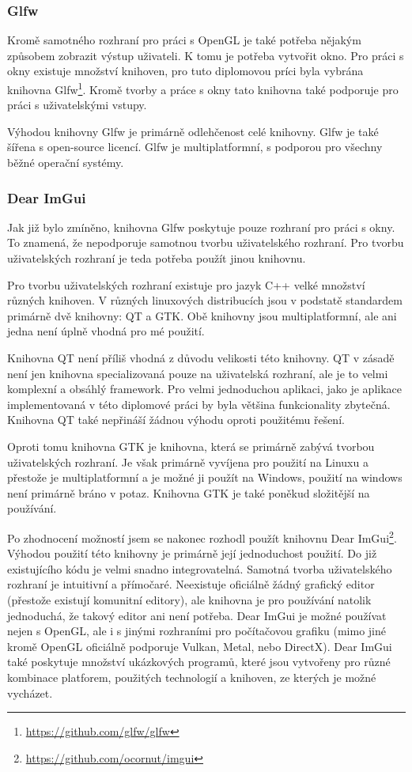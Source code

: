 \documentclass[czech,master]{diploma}
\begin{document}
\subsubsection{Glfw}
Kromě samotného rozhraní pro práci s OpenGL je také potřeba nějakým způsobem zobrazit výstup uživateli. K tomu je potřeba vytvořit okno. Pro práci s okny existuje množství knihoven, pro tuto diplomovou príci byla vybrána knihovna Glfw\footnote{\url{https://github.com/glfw/glfw}}. Kromě tvorby a práce s okny tato knihovna také podporuje pro práci s uživatelskými vstupy. \par
Výhodou knihovny Glfw je primárně odlehčenost celé knihovny. Glfw je také šířena s open-source licencí. Glfw je multiplatformní, s podporou pro všechny běžné operační systémy.

\subsubsection{Dear ImGui}
Jak již bylo zmíněno, knihovna Glfw poskytuje pouze rozhraní pro práci s okny. To znamená, že nepodporuje samotnou tvorbu uživatelského rozhraní. Pro tvorbu uživatelských rozhraní je teda potřeba použít jinou knihovnu. \par
Pro tvorbu uživatelských rozhraní existuje pro jazyk C++ velké množství různých knihoven. V různých linuxových distribucích jsou v podstatě standardem primárně dvě knihovny: QT a GTK\@. Obě knihovny jsou multiplatformní, ale ani jedna není úplně vhodná pro mé použití.\par Knihovna QT není příliš vhodná z důvodu velikosti této knihovny. QT v zásadě není jen knihovna specializovaná pouze na uživatelská rozhraní, ale je to velmi komplexní a obsáhlý framework. Pro velmi jednoduchou aplikaci, jako je aplikace implementovaná v této diplomové práci by byla většina funkcionality zbytečná. Knihovna QT také nepřináší žádnou výhodu oproti použitému řešení.\par
Oproti tomu knihovna GTK je knihovna, která se primárně zabývá tvorbou uživatelských rozhraní. Je však primárně vyvíjena pro použití na Linuxu a přestože je multiplatformní a je možné ji použít na Windows, použití na windows není primárně bráno v potaz. Knihovna GTK je také poněkud složitější na používání. \par
Po zhodnocení možností jsem se nakonec rozhodl použít knihovnu Dear ImGui\footnote{\url{https://github.com/ocornut/imgui}}. Výhodou použití této knihovny je primárně její jednoduchost použití. Do již existujícího kódu je velmi snadno integrovatelná. Samotná tvorba uživatelského rozhraní je intuitivní a přímočaré. Neexistuje oficiálně žádný grafický editor (přestože existují komunitní editory), ale knihovna je pro používání natolik jednoduchá, že takový editor ani není potřeba. Dear ImGui je možné používat nejen s OpenGL, ale i s jinými rozhraními pro počítačovou grafiku (mimo jiné kromě OpenGL oficiálně podporuje Vulkan, Metal, nebo DirectX). Dear ImGui také poskytuje množství ukázkových programů, které jsou vytvořeny pro různé kombinace platforem, použitých technologií a knihoven, ze kterých je možné vycházet. \par
\end{document}
